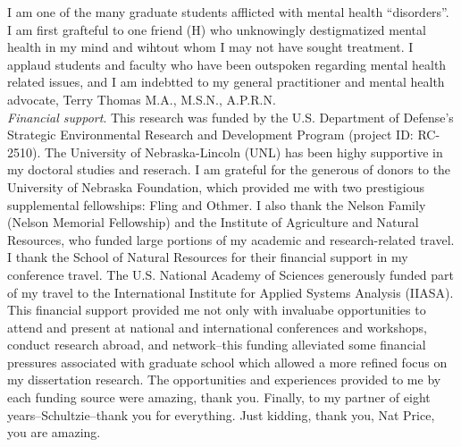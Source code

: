 \documentclass[12pt,twoside,openany]{reedthesis}
\begin{document}
\begin{acknowledgements}
    I am one of the many graduate students afflicted with mental health ``disorders''. I am first grafteful to one friend (H) who unknowingly destigmatized mental health in my mind and wihtout whom I may not have sought treatment. I applaud students and faculty who have been outspoken regarding mental health related issues, and I am indebtted to my general practitioner and mental health advocate, Terry Thomas M.A., M.S.N., A.P.R.N.\\
    \emph{Financial support}. This research was funded by the U.S. Department of Defense's Strategic Environmental Research and Development Program (project ID: RC-2510). The University of Nebraska-Lincoln (UNL) has been highy supportive in my doctoral studies and reserach. I am grateful for the generous of donors to the University of Nebraska Foundation, which provided me with two prestigious supplemental fellowships: Fling and Othmer. I also thank the Nelson Family (Nelson Memorial Fellowship) and the Institute of Agriculture and Natural Resources, who funded large portions of my academic and research-related travel. I thank the School of Natural Resources for their financial support in my conference travel. The U.S. National Academy of Sciences generously funded part of my travel to the International Institute for Applied Systems Analysis (IIASA). This financial support provided me not only with invaluabe opportunities to attend and present at national and international conferences and workshops, conduct research abroad, and network--this funding alleviated some financial pressures associated with graduate school which allowed a more refined focus on my dissertation research. The opportunities and experiences provided to me by each funding source were amazing, thank you.
    Finally, to my partner of eight years--Schultzie--thank you for everything. Just kidding, thank you, Nat Price, you are amazing.
  \end{acknowledgements}

  \hypersetup{linkcolor=black}
  \setcounter{tocdepth}{2}
  \tableofcontents

  \listoftables

  \listoffigures
\end{document}
